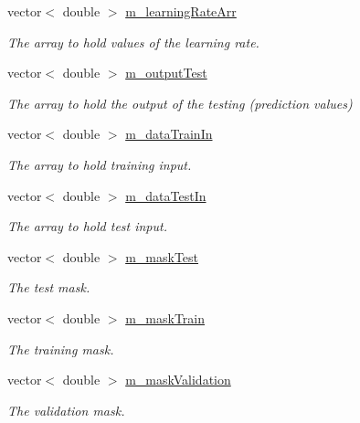 \begin{DoxyCompactItemize}
vector$<$ double $>$ \hyperlink{classTrainingAlgorithm_a906835e7f43946669af7137eb982d237}{m\+\_\+learning\+Rate\+Arr}
\begin{DoxyCompactList}\small\item\em The array to hold values of the learning rate. \end{DoxyCompactList}\item 
vector$<$ double $>$ \hyperlink{classTrainingAlgorithm_a1e91ea3d8b4285bab8c6dcbb4e9d89b2}{m\+\_\+output\+Test}
\begin{DoxyCompactList}\small\item\em The array to hold the output of the testing (prediction values) \end{DoxyCompactList}\item 
vector$<$ double $>$ \hyperlink{classTrainingAlgorithm_aeac2031120727ea87473eeb08a0d2386}{m\+\_\+data\+Train\+In}
\begin{DoxyCompactList}\small\item\em The array to hold training input. \end{DoxyCompactList}\item 
vector$<$ double $>$ \hyperlink{classTrainingAlgorithm_ad92157e128c9165861ef003216621039}{m\+\_\+data\+Test\+In}
\begin{DoxyCompactList}\small\item\em The array to hold test input. \end{DoxyCompactList}\item 
vector$<$ double $>$ \hyperlink{classTrainingAlgorithm_acad03968ff1bf0e172f35a1f14c20db3}{m\+\_\+mask\+Test}
\begin{DoxyCompactList}\small\item\em The test mask. \end{DoxyCompactList}\item 
vector$<$ double $>$ \hyperlink{classTrainingAlgorithm_a66d4930727c81f03fd28e75eb0c89947}{m\+\_\+mask\+Train}
\begin{DoxyCompactList}\small\item\em The training mask. \end{DoxyCompactList}\item 
vector$<$ double $>$ \hyperlink{classTrainingAlgorithm_a92a2cee29169fb2e4d92089ffcd2f73b}{m\+\_\+mask\+Validation}
\begin{DoxyCompactList}\small\item\em The validation mask. \end{DoxyCompactList}\item 

\end{DoxyCompactItemize}
